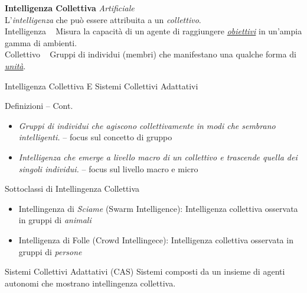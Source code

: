 \documentclass[presentation, 10pt,aspectratio=169]{beamer}\mode<presentation>{\usetheme{AMSBolognaFC}}
\begin{document}
{


\begin{frame}[c]
	
	{
	\color{customfg}

	\begin{center}
	\Large\textbf{Intelligenza Collettiva} \emph{Artificiale} \\
	
	L'\alert{\emph{intelligenza}} che può essere attribuita a un \alert{\emph{collettivo}}.
	\\ \vspace{1cm}
		\large{\alert{Intelligenza}} \faArrowRight ~ Misura la capacità di un agente di raggiungere \underline{\emph{obiettivi}} in un'ampia gamma di ambienti.  \\

		\large{\alert{Collettivo}} \faArrowRight ~ Gruppi di individui (membri) che manifestano una qualche forma di \underline{\emph{unità}}. \\

	\end{center}

	\vspace{1cm}	
}
\end{frame}
}
\begin{frame}{Intelligenza Collettiva E Sistemi Collettivi Adattativi}
	\begin{alertblock}{Definizioni -- Cont.}
		\begin{itemize}
			\item \emph{Gruppi di individui che agiscono collettivamente in modi che sembrano intelligenti.} -- focus sul concetto di \alert{gruppo}
			\item \emph{Intelligenza che emerge a livello macro di un collettivo e trascende quella dei singoli individui.} -- focus sul livello \alert{macro} e \alert{micro}
		\end{itemize}
	\end{alertblock}
	\begin{exampleblock}{Sottoclassi di Intellingenza Collettiva}
		\begin{itemize}
			\item Intellingenza di \emph{Sciame} (\alert{Swarm Intelligence}): Intelligenza collettiva osservata in gruppi di \emph{animali}
			\item Intelligenza di Folle (\alert{Crowd Intellingece}): Intelligenza collettiva osservata in gruppi di \emph {persone}
		\end{itemize}
	\end{exampleblock}
	\begin{block}{Sistemi Collettivi Adattativi (CAS)}
		Sistemi composti da un insieme di agenti autonomi che mostrano intellingenza collettiva.
	\end{block}
\end{frame}
\end{document}
